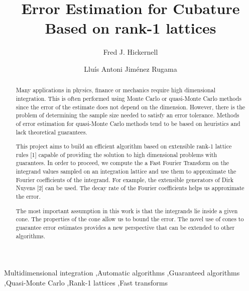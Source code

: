 \documentclass[]{elsarticle}
\theoremstyle{definition}
\begin{document}
\begin{frontmatter}

\title{Error Estimation for Cubature Based on rank-1 lattices}
\author{Fred J. Hickernell}
\address{Room E1-208, Department of Applied Mathematics, Illinois Institute of Technology,\\ 10 W.\ 32$^{\text{nd}}$ St., Chicago, IL 60616}
\author{Llu\'{i}s Antoni Jim\'{e}nez Rugama}
\address{Room E1-120, Department of Applied Mathematics, Illinois Institute of Technology,\\ 10 W.\ 32$^{\text{nd}}$ St., Chicago, IL 60616}
\begin{abstract}


Many applications in physics, finance or mechanics require high dimensional integration. This is often performed using Monte Carlo or quasi-Monte Carlo methods since the error of the estimate does not depend on the dimension. However, there is the problem of determining the sample size needed to satisfy an error tolerance. Methods of error estimation for quasi-Monte Carlo methods tend to be based on heuristics and lack theoretical guarantees.

This project aims to build an efficient algorithm based on extensible rank-1 lattice rules [1] capable of providing the solution to high dimensional problems with guarantees. In order to proceed, we compute the a Fast Fourier Transform on the integrand values sampled on an integration lattice and use them to approximate the Fourier coefficients of the integrand. For example, the extensible generators of Dirk Nuyens [2] can be used. The decay rate of the Fourier coefficients helps us approximate the error.

The most important assumption in this work is that the integrands lie inside a given cone. The properties of the cone allow us to bound the error. The novel use of cones to guarantee error estimates provides a new perspective that can be extended to other algorithms.
\end{abstract}

\begin{keyword}
Multidimensional integration \sep Automatic algorithms \sep Guaranteed algorithms \sep Quasi-Monte Carlo \sep Rank-1 lattices \sep Fast transforms


\end{keyword}
\end{frontmatter}
\end{document}
